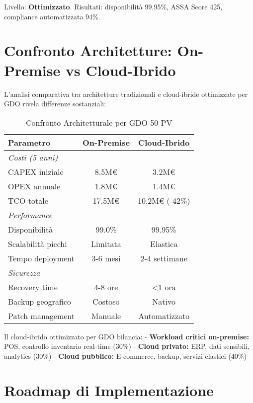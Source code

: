 Livello: \textbf{Ottimizzato}. Risultati: disponibilità 99.95\%, ASSA Score 425, compliance automatizzata 94\%.

\section{Confronto Architetture: On-Premise vs Cloud-Ibrido}
\label{sec:confronto_architetture}

L'analisi comparativa tra architetture tradizionali e cloud-ibride ottimizzate per GDO rivela differenze sostanziali:

\begin{table}[htbp]
\centering
\caption{Confronto Architetturale per GDO 50 PV}
\label{tab:confronto_arch}
\begin{tabular}{lcc}
\toprule
\textbf{Parametro} & \textbf{On-Premise} & \textbf{Cloud-Ibrido} \\
\midrule
\multicolumn{3}{l}{\textit{Costi (5 anni)}} \\
CAPEX iniziale & 8.5M€ & 3.2M€ \\
OPEX annuale & 1.8M€ & 1.4M€ \\
TCO totale & 17.5M€ & 10.2M€ (-42\%) \\
\midrule
\multicolumn{3}{l}{\textit{Performance}} \\
Disponibilità & 99.0\% & 99.95\% \\
Scalabilità picchi & Limitata & Elastica \\
Tempo deployment & 3-6 mesi & 2-4 settimane \\
\midrule
\multicolumn{3}{l}{\textit{Sicurezza}} \\
Recovery time & 4-8 ore & <1 ora \\
Backup geografico & Costoso & Nativo \\
Patch management & Manuale & Automatizzato \\
\bottomrule
\end{tabular}
\end{table}

Il cloud-ibrido ottimizzato per GDO bilancia:
- \textbf{Workload critici on-premise:} POS, controllo inventario real-time (30\%)
- \textbf{Cloud privato:} ERP, dati sensibili, analytics (30\%)
- \textbf{Cloud pubblico:} E-commerce, backup, servizi elastici (40\%)

\section{Roadmap di Implementazione}
\label{sec:roadmap}

